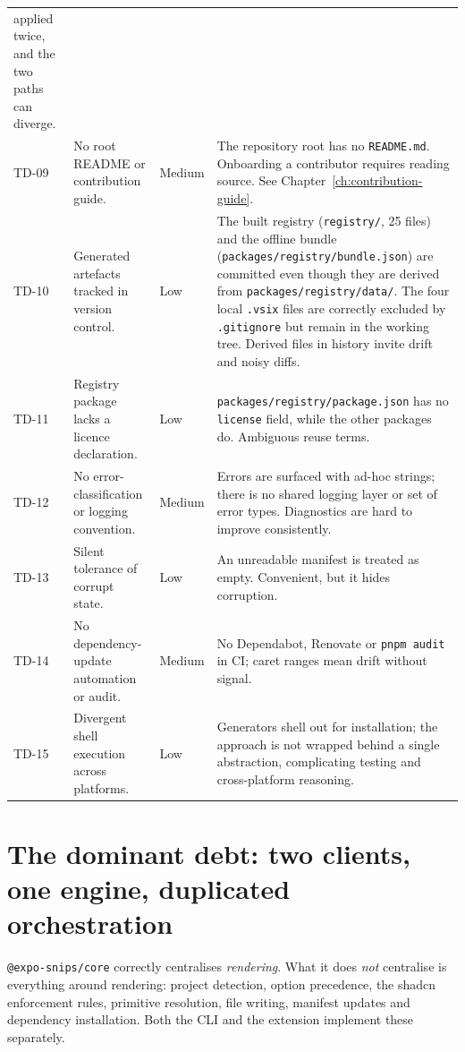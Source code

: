 \begin{longtable}{@{}L{1.2cm}L{3.6cm}L{1.7cm}L{7.1cm}@{}}
applied twice, and the two paths can diverge. \\
TD-09 & No root README or contribution guide. & Medium & The repository root has
no \texttt{README.md}. Onboarding a contributor requires reading source. See
Chapter~\ref{ch:contribution-guide}. \\
TD-10 & Generated artefacts tracked in version control. & Low & The built
registry (\texttt{registry/}, 25 files) and the offline bundle
(\texttt{packages/registry/bundle.json}) are committed even though they are
derived from \texttt{packages/registry/data/}. The four local \texttt{.vsix}
files are correctly excluded by \texttt{.gitignore} but remain in the working
tree. Derived files in history invite drift and noisy diffs. \\
TD-11 & Registry package lacks a licence declaration. & Low &
\texttt{packages/registry/package.json} has no \texttt{license} field, while the
other packages do. Ambiguous reuse terms. \\
TD-12 & No error-classification or logging convention. & Medium & Errors are
surfaced with ad-hoc strings; there is no shared logging layer or set of error
types. Diagnostics are hard to improve consistently. \\
TD-13 & Silent tolerance of corrupt state. & Low & An unreadable manifest is
treated as empty. Convenient, but it hides corruption. \\
TD-14 & No dependency-update automation or audit. & Medium & No Dependabot,
Renovate or \texttt{pnpm audit} in CI; caret ranges mean drift without signal. \\
TD-15 & Divergent shell execution across platforms. & Low & Generators shell out
for installation; the approach is not wrapped behind a single abstraction,
complicating testing and cross-platform reasoning. \\
\bottomrule
\end{longtable}

\section{The dominant debt: two clients, one engine, duplicated orchestration}

\texttt{@expo-snips/core} correctly centralises \emph{rendering}. What it does
\emph{not} centralise is everything around rendering: project detection, option
precedence, the shadcn enforcement rules, primitive resolution, file writing,
manifest updates and dependency installation. Both the CLI and the extension
implement these separately.

